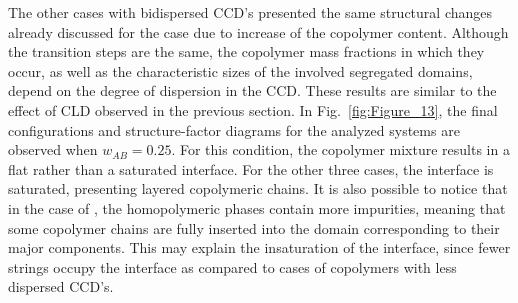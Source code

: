 \documentclass[
aip,
jcp,
reprint,
]{revtex4-1}
\begin{document}
The other cases with bidispersed CCD's presented the same structural changes already discussed for the  case due to increase of the copolymer content.
Although the transition steps are the same, the copolymer mass fractions in which they occur, as well as the characteristic sizes of the involved segregated domains, depend on the degree of dispersion in the CCD.
These results are similar to the effect of CLD observed in the previous section.
In Fig.~\ref{fig:Figure_13}, the final configurations and structure-factor diagrams for the analyzed systems are observed when $w_{AB}=0.25$.
For this condition, the copolymer mixture  results in a flat rather than a saturated interface.
For the other three cases, the interface is saturated, presenting layered copolymeric chains.
It is also possible to notice that in the case of , the homopolymeric phases contain more impurities, meaning that some copolymer chains are fully inserted into the domain corresponding to their major components.
This may explain the insaturation of the interface, since fewer strings occupy the interface as compared to cases of copolymers with less dispersed CCD's.
\end{document}
